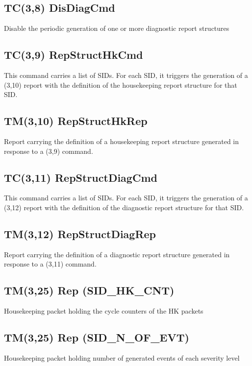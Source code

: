 \pagebreak
\subsection{TC(3,8) DisDiagCmd}
Disable the periodic generation of one or more diagnostic report structures

\pagebreak
\subsection{TC(3,9) RepStructHkCmd}
This command carries a list of SIDs. For each SID, it triggers the generation of a (3,10) report with the definition of the housekeeping report structure for that SID.

\pagebreak
\subsection{TM(3,10) RepStructHkRep}
Report carrying the definition of a housekeeping report structure generated in response to a (3,9) command.

\pagebreak
\subsection{TC(3,11) RepStructDiagCmd}
This command carries a list of SIDs. For each SID, it triggers the generation of a (3,12) report with the definition of the diagnostic report structure for that SID.

\pagebreak
\subsection{TM(3,12) RepStructDiagRep}
Report carrying the definition of a diagnostic report structure generated in response to a (3,11) command.

\pagebreak
\subsection{TM(3,25) Rep (SID\_\-HK\_\-CNT)}
Housekeeping packet holding the cycle counters of the HK packets

\pagebreak
\subsection{TM(3,25) Rep (SID\_\-N\_\-OF\_\-EVT)}
Housekeeping packet holding number of generated events of each severity level

